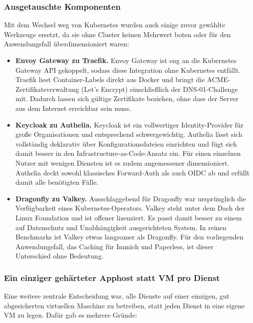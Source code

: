 \subsubsection*{Ausgetauschte Komponenten}

Mit dem Wechsel weg von Kubernetes wurden auch einige zuvor gewählte Werkzeuge
ersetzt, da sie ohne Cluster keinen Mehrwert boten oder für den Anwendungsfall
überdimensioniert waren:

\begin{itemize}
  \item \textbf{Envoy Gateway zu Traefik.} Envoy Gateway ist eng an die
    Kubernetes Gateway \ac{API} gekoppelt, sodass diese Integration ohne
    Kubernetes entfällt. Traefik liest Container-Labels direkt aus Docker und
    bringt die \ac{ACME}-Zertifikatsverwaltung (Let's Encrypt) einschließlich
    der \ac{DNS}-01-Challenge mit. Dadurch lassen sich gültige Zertifikate
    beziehen, ohne dass der Server aus dem Internet erreichbar sein muss.
  \item \textbf{Keycloak zu Authelia.} Keycloak ist ein vollwertiger
    Identity-Provider für große Organisationen und entsprechend
    schwergewichtig. Authelia lässt sich vollständig deklarativ über
    Konfigurationsdateien einrichten und fügt sich damit besser in den
    Infrastructure-as-Code-Ansatz ein. Für einen einzelnen Nutzer mit wenigen
    Diensten ist es zudem angemessener dimensioniert. Authelia deckt sowohl
    klassisches Forward-Auth als auch \ac{OIDC} ab und erfüllt damit alle
    benötigten Fälle.\cite{keyCloak}
  \item \textbf{Dragonfly zu Valkey.} Ausschlaggebend für Dragonfly war
    ursprünglich die Verfügbarkeit eines Kubernetes-Operators. Valkey steht
    unter dem Dach der Linux Foundation und ist offener lizenziert. Es passt
    damit besser zu einem auf Datenschutz und Unabhängigkeit ausgerichteten
    System. In reinen Benchmarks ist Valkey etwas langsamer als Dragonfly.
    Für den vorliegenden Anwendungsfall, das Caching für Immich und
    Paperless, ist dieser Unterschied ohne Bedeutung.
\end{itemize}

\subsubsection*{Ein einziger gehärteter Apphost statt \ac{VM} pro Dienst}

Eine weitere zentrale Entscheidung war, alle Dienste auf einer einzigen, gut
abgesicherten virtuellen Maschine zu betreiben, statt jeden Dienst in eine
eigene \ac{VM} zu legen. Dafür gab es mehrere Gründe:

